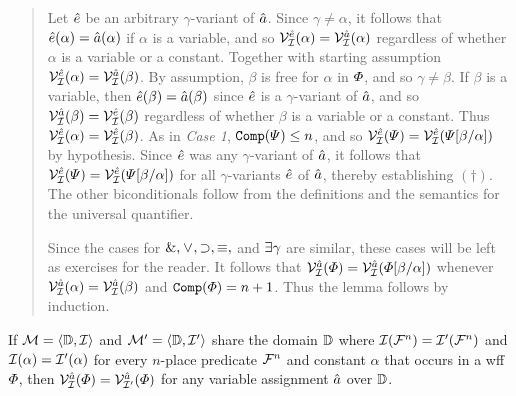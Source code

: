 \begin{quote}
  Let $\hat{e}$ be an arbitrary $\gamma$-variant of $\hat{a}$.
  Since $\gamma\neq\alpha$, it follows that $\hat{e}(\alpha)=\hat{a}(\alpha)$ if $\alpha$ is a variable, and so $\mathcal{V}_{\mathcal{I}}^{\hat{e}}(\alpha)=\mathcal{V}_{\mathcal{I}}^{\hat{a}}(\alpha)$ regardless of whether $\alpha$ is a variable or a constant.
  Together with starting assumption $\mathcal{V}_{\mathcal{I}}^{\hat{e}}(\alpha)=\mathcal{V}_{\mathcal{I}}^{\hat{a}}(\beta)$.
  By assumption, $\beta$ is free for $\alpha$ in $\varPhi$, and so $\gamma\neq\beta$.
  If $\beta$ is a variable, then $\hat{e}(\beta)=\hat{a}(\beta)$ since $\hat{e}$ is a $\gamma$-variant of $\hat{a}$, and so $\mathcal{V}_{\mathcal{I}}^{\hat{a}}(\beta)=\mathcal{V}_{\mathcal{I}}^{\hat{e}}(\beta)$ regardless of whether $\beta$ is a variable or a constant.
  Thus $\mathcal{V}_{\mathcal{I}}^{\hat{e}}(\alpha)=\mathcal{V}_{\mathcal{I}}^{\hat{e}}(\beta)$.
  As in \textit{Case 1}, $\texttt{Comp}(\varPsi)\leq n$, and so $\mathcal{V}_{\mathcal{I}}^{\hat{e}}(\varPsi)=\mathcal{V}_{\mathcal{I}}^{\hat{e}}(\varPsi[\beta/\alpha])$ by hypothesis.
  Since $\hat{e}$ was any $\gamma$-variant of $\hat{a}$, it follows that $\mathcal{V}_{\mathcal{I}}^{\hat{e}}(\varPsi)=\mathcal{V}_{\mathcal{I}}^{\hat{e}}(\varPsi[\beta/\alpha])$ for all $\gamma$-variants $\hat{e}$ of $\hat{a}$, thereby establishing $(\dagger)$.
  The other biconditionals follow from the definitions and the semantics for the universal quantifier.

  Since the cases for $\mathrel\&,\mkern1mu\vee\mkern1mu,\supset,\equiv,$ and $\exists \gamma$ are similar, these cases will be left as exercises for the reader.
  It follows that $\mathcal{V}_{\mathcal{I}}^{\hat{a}}(\varPhi)=\mathcal{V}_{\mathcal{I}}^{\hat{a}}(\varPhi[\beta/\alpha])$ whenever $\mathcal{V}_{\mathcal{I}}^{\hat{a}}(\alpha)=\mathcal{V}_{\mathcal{I}}^{\hat{a}}(\beta)$ and $\texttt{Comp}(\varPhi)=n+1$.
  Thus the lemma follows by induction.
\end{quote}




\begin{Lthm} \label{lemma:model}
  If $\mathcal{M}=\langle\mathbb{D},\mathcal{I}\rangle$ and $\mathcal{M}'=\langle\mathbb{D},\mathcal{I}'\rangle$ share the domain $\mathbb{D}$ where $\mathcal{I}(\mathcal{F}^n)=\mathcal{I}'(\mathcal{F}^n)$ and $\mathcal{I}(\alpha)=\mathcal{I}'(\alpha)$ for every $n$-place predicate $\mathcal{F}^n$ and constant $\alpha$ that occurs in a wff $\varPhi$, then $\mathcal{V}_{\mathcal{I}}^{\hat{a}}(\varPhi)=\mathcal{V}_{\mathcal{I}'}^{\hat{a}}(\varPhi)$ for any variable assignment $\hat{a}$ over $\mathbb{D}$.
\end{Lthm}

